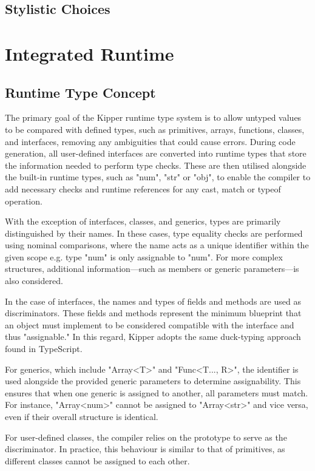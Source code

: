 \subsection{Stylistic Choices}

\section{Integrated Runtime}
\label{sec:integrated-runtime}

\subsection{Runtime Type Concept}

The primary goal of the Kipper runtime type system is to allow untyped values to be compared with defined types, such as primitives, arrays, functions, classes, and interfaces, removing any ambiguities that could cause errors. During code generation, all user-defined interfaces are converted into runtime types that store the information needed to perform type checks. These are then utilised alongside the built-in runtime types, such as "num", "str" or "obj", to enable the compiler to add necessary checks and runtime references for any cast, match or typeof operation.

With the exception of interfaces, classes, and generics, types are primarily distinguished by their names. In these cases, type equality checks are performed using nominal comparisons, where the name acts as a unique identifier within the given scope e.g. type "num" is only assignable to "num". For more complex structures, additional information—such as members or generic parameters—is also considered.

In the case of interfaces, the names and types of fields and methods are used as discriminators. These fields and methods represent the minimum blueprint that an object must implement to be considered compatible with the interface and thus "assignable." In this regard, Kipper adopts the same duck-typing approach found in TypeScript.

For generics, which include "Array<T>" and "Func<T..., R>", the identifier is used alongside the provided generic parameters to determine assignability. This ensures that when one generic is assigned to another, all parameters must match. For instance, "Array<num>" cannot be assigned to "Array<str>" and vice versa, even if their overall structure is identical.

For user-defined classes, the compiler relies on the prototype to serve as the discriminator. In practice, this behaviour is similar to that of primitives, as different classes cannot be assigned to each other.

